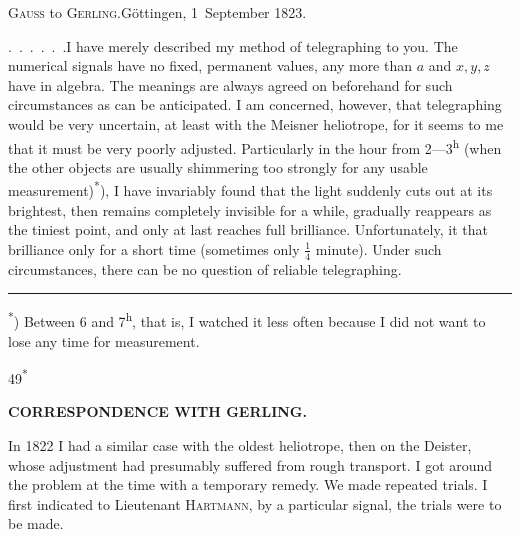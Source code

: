 \begingroup
\newcommand{\GerlingSeptSeconds}[2]{#1\makebox[.42em][c]{,\makebox[0pt][r]{\textsuperscript{s}}}#2}
\begin{center}
\textsc{Gauss} to \textsc{Gerling}.\quad Göttingen, 1~September 1823.
\end{center}

\par\noindent\hspace*{\parindent}\mbox{.\ .\ .\ .\ .\ .\quad I} have merely described my method of telegraphing to you. The numerical signals have no fixed, permanent values, any more than \(a\) and \(x,y,z\) have in algebra. The meanings are always agreed on beforehand for such circumstances as can be anticipated.
I am concerned, however, that telegraphing would be very uncertain, at least with the Meisner heliotrope, for it seems to me that it must be very poorly adjusted.
Particularly in the hour from 2---3\textsuperscript{h} (when the other objects are usually shimmering too strongly for any usable measurement)\textsuperscript{*}), I have invariably found that the light suddenly cuts out at its brightest, then remains completely invisible for a while, gradually reappears as the tiniest point, and only at last reaches full brilliance. Unfortunately, it  that brilliance only for a short time (sometimes only \(\frac{1}{4}\) minute). Under such circumstances, there can be no question of reliable telegraphing.
\par\smallskip\noindent\rule{.24\linewidth}{.4pt}\par\nobreak
{\footnotesize\noindent\hspace*{\parindent}\textsuperscript{*}) Between 6 and 7\textsuperscript{h}, that is, I watched it less often because I did not want to lose any time for measurement.\par}
\smallskip\noindent\hfill{\small49\textsuperscript{*}}\hspace*{.123\linewidth}\par
\clearpage
\noindent{}\hfill{\small\textbf{CORRESPONDENCE WITH GERLING.}}\hfill\null\par\medskip
\par\noindent\hspace*{\parindent}In 1822 I had a similar case with the oldest heliotrope, then on the Deister, whose adjustment had presumably suffered from rough transport.
I got around the problem at the time with a temporary remedy.
We made repeated trials. I first indicated to Lieutenant \textsc{Hartmann}, by a particular signal,  the trials were to be made.
